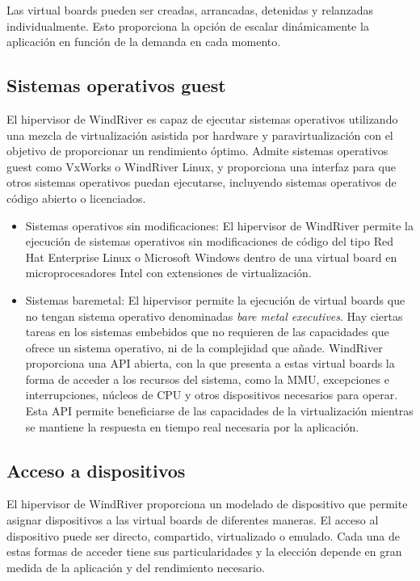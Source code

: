 Las virtual boards pueden ser creadas, arrancadas, detenidas y relanzadas individualmente. Esto proporciona la opción de escalar dinámicamente la aplicación en función de la demanda en cada momento.

\subsection{Sistemas operativos guest}
El hipervisor de WindRiver es capaz de ejecutar sistemas operativos utilizando una mezcla de virtualización asistida por hardware y paravirtualización con el objetivo de proporcionar un rendimiento óptimo. Admite sistemas operativos guest como VxWorks o WindRiver Linux, y proporciona una interfaz para que otros sistemas operativos puedan ejecutarse, incluyendo sistemas operativos de código abierto o licenciados.\\

\begin {itemize}
\item Sistemas operativos sin modificaciones: El hipervisor de WindRiver permite la ejecución de sistemas operativos sin modificaciones de código del tipo Red Hat Enterprise Linux o Microsoft Windows dentro de una virtual board en microprocesadores Intel con extensiones de virtualización.\\

\item Sistemas baremetal: El hipervisor permite la ejecución de virtual boards que no tengan sistema operativo denominadas \textit{bare metal executives}. Hay ciertas tareas en los sistemas embebidos que no requieren de las capacidades que ofrece un sistema operativo, ni de la complejidad que añade. WindRiver proporciona una \acrshort{API} abierta, con la que presenta a estas virtual boards la forma de acceder a los recursos del sistema, como la \acrshort{MMU}, excepciones e interrupciones, núcleos de CPU y otros dispositivos necesarios para operar. Esta \acrshort{API} permite beneficiarse de las capacidades de la virtualización mientras se mantiene la respuesta en tiempo real necesaria por la aplicación.
\end{itemize}

\subsection{Acceso a dispositivos}
El hipervisor de WindRiver proporciona un modelado de dispositivo que permite asignar dispositivos a las virtual boards de diferentes maneras. El acceso al dispositivo puede ser directo, compartido, virtualizado o emulado. Cada una de estas formas de acceder tiene sus particularidades y la elección depende en gran medida de la aplicación y del rendimiento necesario.

